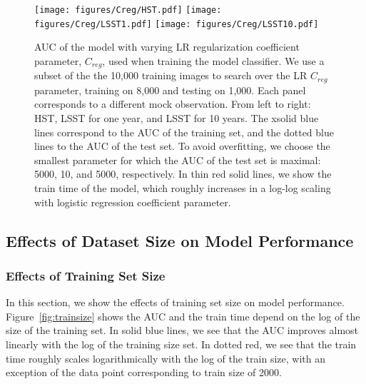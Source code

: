 \documentclass{emulateapj}
\begin{document}
\begin{figure*}[t]\label{fig:regularization}
\begin{center}
\texttt{[image: figures/Creg/HST.pdf]}
\texttt{[image: figures/Creg/LSST1.pdf]}
\texttt{[image: figures/Creg/LSST10.pdf]}
\caption{AUC of the model with varying LR regularization coefficient
  parameter, $C_{reg}$, used when training the model classifier.  We
  use a subset of the the 10,000 training images to search over the LR
  $C_{reg}$ parameter, training on 8,000 and testing on 1,000.  Each
  panel corresponds to a different mock observation.  From left to
  right: HST, LSST for one year, and LSST for 10 years.  The xsolid
  blue lines correspond to the AUC of the training set, and the dotted
  blue lines to the AUC of the test set.  To avoid overfitting, we
  choose the smallest parameter for which the AUC of the test set is
  maximal: 5000, 10, and 5000, respectively.  In thin red solid lines,
  we show the train time of the model, which roughly increases in a
  log-log scaling with logistic regression coefficient parameter.}
\end{center}
\end{figure*}

\subsection{Effects of Dataset Size on Model Performance}\label{sec:datasize}
\subsubsection{Effects of Training Set Size}
In this section, we show the effects of training set size on model
performance.  Figure~\ref{fig:trainsize} shows the AUC and the train
time depend on the log of the size of the training set.  In solid blue
lines, we see that the AUC improves almost linearly with the log of
the training size set.  In dotted red, we see that the train time
roughly scales logarithmically with the log of the train size, with an
exception of the data point corresponding to train size of 2000.
\end{document}
